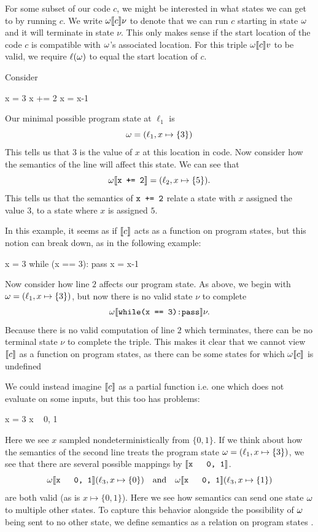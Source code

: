 For some subset of our code $c$, we might be interested in what states we can get to by running $c$.
We write $\omega \llbracket c \rrbracket \nu$ to denote that we can run $c$ starting in state $\omega$ and it will terminate in state $\nu$.
This only makes sense if the start location of the code $c$ is compatible with $\omega$'s associated location. 
For this triple $\omega \llbracket c\rrbracket v$ to be valid, we require $\ell(\omega)$ to equal the start location of $c$.

Consider
\begin{code}
  x = 3
  x += 2
  x = x-1
\end{code}
Our minimal possible program state at $\ell_1$ is
\[
  \omega = (\ell_1, x \mapsto \{3\})
\]
This tells us that $3$ is the value of $x$ at this location in code.
Now consider how the semantics of the line  will affect this state.
We can see that 
\[\omega \llbracket \texttt{x += 2}\rrbracket = (\ell_2, x\mapsto \{5\}).\]
This tells us that the semantics of $\texttt{x += 2}$ relate a state with $x$ assigned the value $3$, to a state where $x$ is assigned $5$.

In this example, it seems as if $\llbracket c \rrbracket$ acts as a function on program states, but this notion can break down, as in the following example:

\begin{code}
x = 3
while (x == 3): pass
x = x-1
\end{code}

Now consider how line $2$ affects our program state.
As above, we begin with $\omega = (\ell_1, x \mapsto \{3\})$, but now there is no valid state $\nu$ to complete
\[
  \omega \llbracket \texttt{while(x == 3):pass} \rrbracket \nu.
\]
Because there is no valid computation of line $2$ which terminates, there can be no terminal state $\nu$ to complete the triple.
This makes it clear that we cannot view $\llbracket c \rrbracket$ as a function on program states, as there can be some states for which $\omega\llbracket c \rrbracket$ is undefined

We could instead imagine $\llbracket c \rrbracket$ as a partial function i.e. one which does not evaluate on some inputs, but this too has problems:
\begin{code}
  x = 3
  x ~ {0, 1}
\end{code}
Here we see $x$ sampled nondeterministically from $\{0,1\}$.
If we think about how the semantics of the second line treats the program state $\omega = (\ell_1, x \mapsto \{3\})$, we see that there are several possible mappings by $\llbracket \texttt{x ~ {0, 1}} \rrbracket$. 
\[\omega\llbracket \texttt{x ~ {0, 1}} \rrbracket (\ell_3, x \mapsto \{0\}) \quad \text{and} \quad \omega\llbracket \texttt{x ~ {0, 1}} \rrbracket (\ell_3, x \mapsto \{1\})\]
are both valid (as is $x \mapsto \{0, 1\}$).
Here we see how semantics can send one state $\omega$ to multiple other states.
To capture this behavior alongside the possibility of $\omega$ being sent to no other state, we define semantics as a relation on program states
\cite{AbstractInterpretationCornellNotes}.

